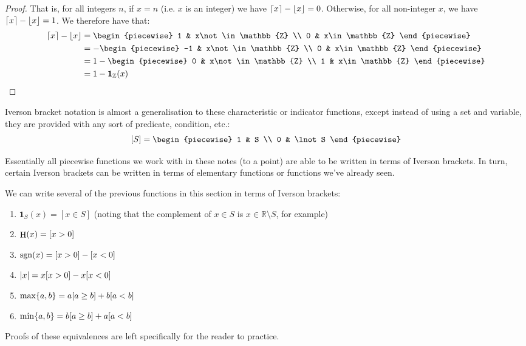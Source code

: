 \begin{theorem}
\begin{proof}
        That is, for all integers $n$, if $x=n$ (i.e. $x$ is an integer) we have $\lceil x\rceil-\lfloor x\rfloor=0$. Otherwise, for all non-integer $x$, we have $\lceil x\rceil-\lfloor x\rfloor=1$. We therefore have that:
        \begin{align*}
            \ceil{x}-\floor{x} &=\begin{piecewise}
                1 & x\not\in\mathbb{Z} \\
                0 & x\in\mathbb{Z}
            \end{piecewise} \\
            &=-\begin{piecewise}
                -1 & x\not\in\mathbb{Z} \\
                0 & x\in\mathbb{Z}
            \end{piecewise} \\
            &=1-\begin{piecewise}
                0 & x\not\in\mathbb{Z} \\
                1 & x\in\mathbb{Z}
            \end{piecewise} \\
            &=1-\mathbf{1}_{\mathbb{Z}}(x)
        \end{align*}
    \end{proof}
\end{theorem}

Iverson bracket notation is almost a generalisation to these characteristic or indicator functions, except instead of using a set and variable, they are provided with any sort of predicate, condition, etc.:
$$
    [S]=\begin{piecewise}
        1 & S \\
        0 & \lnot S
    \end{piecewise}
$$

Essentially all piecewise functions we work with in these notes (to a point) are able to be written in terms of Iverson brackets. In turn, certain Iverson brackets can be written in terms of elementary functions or functions we've already seen.
\begin{theorem}
    We can write several of the previous functions in this section in terms of Iverson brackets:
    \begin{enumerate}
        \item $\mathbf{1}_{S}(x)=[x\in S]$ (noting that the complement of $x\in S$ is $x\in\mathbb{R}\setminus S$, for example)
        \item $\step{x}=[x>0]$
        \item $\sgn{x}=[x>0]-[x<0]$
        \item $\abs{x}=x[x>0]-x[x<0]$
        \item $\max\{a,b\}=a[a\geq b]+b[a<b]$
        \item $\min\{a,b\}=b[a\geq b]+a[a<b]$
    \end{enumerate}

    Proofs of these equivalences are left specifically for the reader to practice.
\end{theorem}

